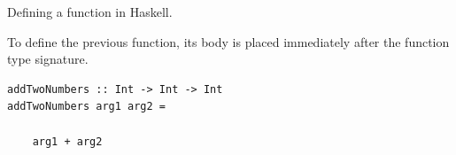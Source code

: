 
\begin{frame}[t, fragile]{Defining a function in Haskell.}

To define the previous function, its body is placed immediately after
the function type signature.

\begin{verbatim}
addTwoNumbers :: Int -> Int -> Int
addTwoNumbers arg1 arg2 =

    arg1 + arg2
\end{verbatim}


\end{frame}
